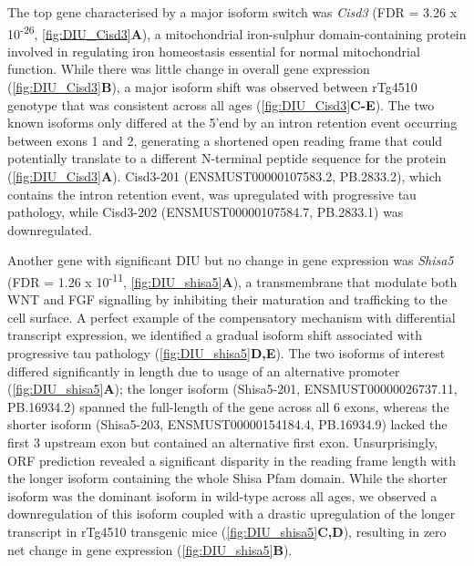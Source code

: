 The top gene characterised by a major isoform switch was \textit{Cisd3} (FDR = 3.26 x 10\textsuperscript{-26}, \cref{fig:DIU_Cisd3}\textbf{A}), a mitochondrial iron-sulphur domain-containing protein involved in regulating iron homeostasis essential for normal mitochondrial function\cite{Wiley2007}. While there was little change in overall gene expression (\cref{fig:DIU_Cisd3}\textbf{B}), a major isoform shift was observed between rTg4510 genotype that was consistent across all ages (\cref{fig:DIU_Cisd3}\textbf{C-E}). The two known isoforms only differed at the 5'end by an intron retention event occurring between exons 1 and 2, generating a shortened open reading frame that could potentially translate to a different N-terminal peptide sequence for the protein (\cref{fig:DIU_Cisd3}\textbf{A}). Cisd3-201 (ENSMUST00000107583.2, PB.2833.2), which contains the intron retention event, was upregulated with progressive tau pathology, while Cisd3-202 (ENSMUST00000107584.7, PB.2833.1) was downregulated.  

Another gene with significant DIU but no change in gene expression was \textit{Shisa5} (FDR = 1.26 x 10\textsuperscript{-11}, \cref{fig:DIU_shisa5}\textbf{A}), a transmembrane that modulate both WNT and FGF signalling by inhibiting their maturation and trafficking to the cell surface\cite{Yamamoto2005}. A perfect example of the compensatory mechanism with differential transcript expression, we identified a gradual isoform shift associated with progressive tau pathology (\cref{fig:DIU_shisa5}\textbf{D,E}). The two isoforms of interest differed significantly in length due to usage of an alternative promoter (\cref{fig:DIU_shisa5}\textbf{A}); the longer isoform (Shisa5-201, ENSMUST00000026737.11, PB.16934.2) spanned the full-length of the gene across all 6 exons, whereas the shorter isoform (Shisa5-203, ENSMUST00000154184.4, PB.16934.9) lacked the first 3 upstream exon but contained an alternative first exon. Unsurprisingly, ORF prediction revealed a significant disparity in the reading frame length with the longer isoform containing the whole Shisa Pfam domain. While the shorter isoform was the dominant isoform in wild-type across all ages, we observed a downregulation of this isoform coupled with a drastic upregulation of the longer transcript in rTg4510 transgenic mice (\cref{fig:DIU_shisa5}\textbf{C,D}), resulting in zero net change in gene expression (\cref{fig:DIU_shisa5}\textbf{B}). 

